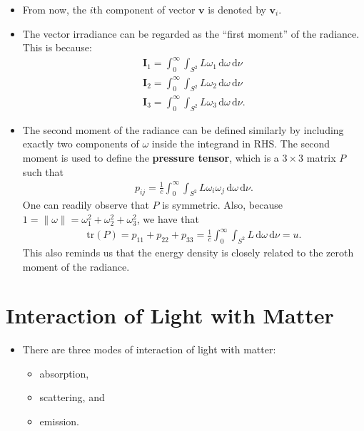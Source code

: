 \documentclass[10pt]{article}
\newcommand{\dee}{\mathrm{d}}
\newcommand{\ve}[1]{\mathbf{#1}}
\newcommand{\tr}{\mathrm{tr}}
\begin{document}
\begin{itemize}
    \item From now, the $i$th component of vector $\ve{v}$ is denoted by $\ve{v}_i$.

    \item The vector irradiance can be regarded as the ``first moment'' of the radiance. This is because:
    \begin{align*}
      \ve{I}_1 = \int_{0}^\infty \int_{S^2} L \omega_1 \, \dee \omega\, \dee \nu \\
      \ve{I}_2 = \int_{0}^\infty \int_{S^2} L \omega_2 \, \dee \omega\, \dee \nu \\
      \ve{I}_3 = \int_{0}^\infty \int_{S^2} L \omega_3 \, \dee \omega\, \dee \nu.
    \end{align*}

    \item The second moment of the radiance can be defined similarly by including exactly two components of $\omega$ inside the integrand in RHS. The second moment is used to define the \textbf{pressure tensor}, which is a $3 \times 3$ matrix $P$ such that
    \begin{align*}
      p_{ij} = \frac{1}{c} \int_{0}^\infty \int_{S^2} L \omega_i \omega_j \, \dee \omega\, \dee \nu.
    \end{align*}
    One can readily observe that $P$ is symmetric. Also, because $1 = \| \omega \| = \omega_{1}^2 + \omega_{2}^2 + \omega_{3}^2$, we have that
    \begin{align*}
      \tr(P) = p_{11} + p_{22} + p_{33} = \frac{1}{c} \int_{0}^\infty \int_{S^2} L \, \dee \omega\, \dee \nu = u.
    \end{align*}
    This also reminds us that the energy density is closely related to the zeroth moment of the radiance.
  \end{itemize}

  \section{Interaction of Light with Matter}
  \begin{itemize}
    \item There are three modes of interaction of light with matter:
    \begin{itemize}
      \item absorption,
      \item scattering, and
      \item emission.
    \end{itemize}    
  \end{itemize}
\end{document}
